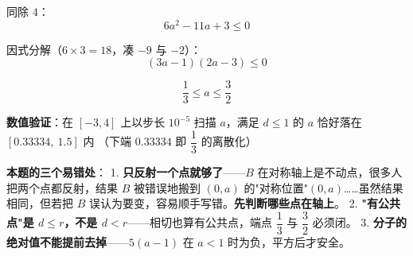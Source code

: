 \begin{answer}
同除 $4$：
\nopagebreak[4]
\[6a^{2}-11a+3\le0\]

因式分解（$6\times3=18$，凑 $-9$ 与 $-2$）：
\nopagebreak[4]
\[(3a-1)(2a-3)\le0\]

\nopagebreak[4]
\[\frac13\le a\le\frac32\]

\textbf{数值验证}：在 $[-3,4]$ 上以步长 $10^{-5}$ 扫描 $a$，满足 $d\le1$ 的 $a$ 恰好落在 $[0.33334,\ 1.5]$ 内 （下端 $0.33334$ 即 $\dfrac13$ 的离散化）

\begin{gktip}
\textbf{本题的三个易错处}：
1. \textbf{只反射一个点就够了}——$B$ 在对称轴上是不动点，很多人把两个点都反射，结果 $B$ 被错误地搬到 $(0,a)$ 的"对称位置"$(0,a)$……虽然结果相同，但若把 $B$ 误认为要变，容易顺手写错。\textbf{先判断哪些点在轴上}。
2. \textbf{"有公共点"是 $d\le r$，不是 $d<r$}——相切也算有公共点，端点 $\dfrac13$ 与 $\dfrac32$ 必须闭。
3. \textbf{分子的绝对值不能提前去掉}——$5(a-1)$ 在 $a<1$ 时为负，平方后才安全。
\end{gktip}


\par\medskip

\end{answer}
